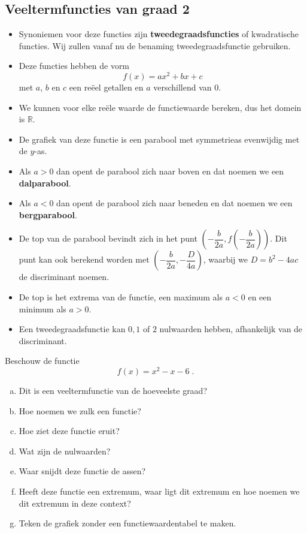 \documentclass[12pt]{article}
\begin{document}
\pagebreak
\subsection{Veeltermfuncties van graad 2}

\begin{itemize}
\item Synoniemen voor deze functies zijn {\bf tweedegraadsfuncties} of kwadratische functies. Wij zullen vanaf nu de benaming tweedegraadsfunctie gebruiken.
\item Deze functies hebben de vorm
  $$f(x) = ax^2+bx+c $$
  met $a$, $b$ en $c$ een reëel getallen en $a$ verschillend van $0$.
\item We kunnen voor elke reële waarde de functiewaarde bereken, dus het domein is $\mathbb{R}$.
\item De grafiek van deze functie is een parabool met symmetrieas evenwijdig met de $y$-as.
\item Als $a>0$ dan opent de parabool zich naar boven en dat noemen we een {\bf dalparabool}.
\item Als $a<0$ dan opent de parabool zich naar beneden en dat noemen we een {\bf bergparabool}.
\item De top van de parabool bevindt zich in het punt $(-\dfrac{b}{2a}, f(-\dfrac{b}{2a}))$. Dit punt kan ook berekend worden met $(-\dfrac{b}{2a}, -\dfrac{D}{4a})$, waarbij we $D=b^2-4ac$ de discriminant noemen.
\item De top is het extrema van de functie, een maximum als $a<0$ en een minimum als $a>0$.
\item Een tweedegraadsfunctie kan $0, 1$ of $2$ nulwaarden hebben, afhankelijk van de discriminant.
\end{itemize}

\begin{oefening}
  Beschouw de functie
  $$f(x)=x^2-x-6\;.$$
  \begin{enumerate}[(a)]
  \item Dit is een veeltermfunctie van de hoeveelste graad?
  \item Hoe noemen we zulk een functie?
  \item Hoe ziet deze functie eruit?
  \item Wat zijn de nulwaarden?
  \item Waar snijdt deze functie de assen?
  \item Heeft deze functie een extremum, waar ligt dit extremum en hoe noemen we dit extremum in deze context?
  \item Teken de grafiek zonder een functiewaardentabel te maken.
  \end{enumerate}
\end{oefening}
\end{document}
